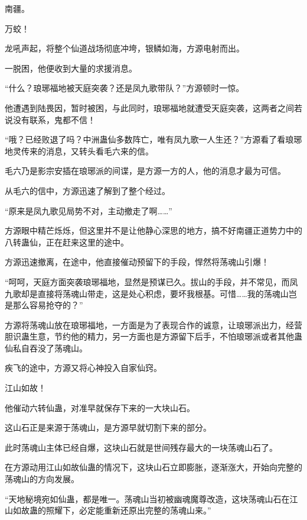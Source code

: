 
\begin{this_body}



南疆。

万蛟！

龙吼声起，将整个仙道战场彻底冲垮，银鳞如海，方源电射而出。

一脱困，他便收到大量的求援消息。

“什么？琅琊福地被天庭突袭？还是凤九歌带队？”方源顿时一惊。

他遭遇到陆畏因，暂时被困，与此同时，琅琊福地就遭受天庭突袭，这两者之间若说没有联系，鬼都不信！

“哦？已经败退了吗？中洲蛊仙多数阵亡，唯有凤九歌一人生还？”方源看了看琅琊地灵传来的消息，又转头看毛六来的信。

毛六乃是影宗安插在琅琊派的间谍，是方源一方的人，他的消息才最为可信。

从毛六的信中，方源迅速了解到了整个经过。

“原来是凤九歌见局势不对，主动撤走了啊……”

方源眼中精芒烁烁，但这里并不是让他静心深思的地方，搞不好南疆正道势力中的八转蛊仙，正在赶来这里的途中。

方源迅速撤离，在途中，他直接催动预留下的手段，悍然将荡魂山引爆！

“呵呵，天庭方面突袭琅琊福地，显然是预谋已久。拔山的手段，并不常见，而凤九歌却是直接将荡魂山带走，这是处心积虑，要坏我根基。可惜……我的荡魂山岂是那么容易抢夺的？”

方源将荡魂山放在琅琊福地，一方面是为了表现合作的诚意，让琅琊派出力，经营胆识蛊生意，节约他的精力，另一方面也是方源留下后手，不怕琅琊派或者其他蛊仙私自吞没了荡魂山。

疾飞的途中，方源又将心神投入自家仙窍。

江山如故！

他催动六转仙蛊，对准早就保存下来的一大块山石。

这山石正是来源于荡魂山，是方源早就切割下来的部分。

此时荡魂山主体已经自爆，这块山石就是世间残存最大的一块荡魂山石了。

在方源动用江山如故仙蛊的情况下，这块山石立即膨胀，逐渐涨大，开始向完整的荡魂山的方向发展。

“天地秘境宛如仙蛊，都是唯一。荡魂山当初被幽魂魔尊改造，这块荡魂山石在江山如故蛊的照耀下，必定能重新还原出完整的荡魂山来。”


\end{this_body}
